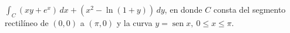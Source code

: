 \item $\int_C (xy + e^x) \, dx + (x^2 - \ln(1 + y)) \, dy$, en donde $C$ consta del segmento rectilíneo de $(0, 0)$ a $(\pi, 0)$ y la curva $y = \operatorname{sen} x, \ 0 \le x \le \pi$.
